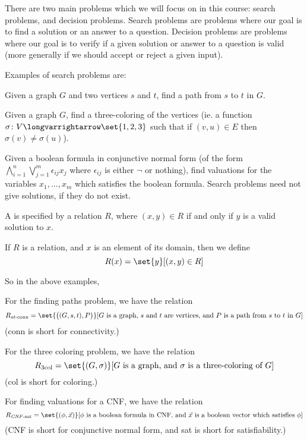 \documentclass[10pt]{article}
\let\longto=\longvarrightarrow
\begin{document}


\bigskip

There are two main problems which we will focus on in this course: search problems, and decision problems.
Search problems are problems where our goal is to find a solution or an answer to a question.
Decision problems are problems where our goal is to verify if a given solution or answer to a question is valid (more generally if we should accept or reject a given input).

Examples of search problems are:
\benum
    \item Given a graph $G$ and two vertices $s$ and $t$, find a path from $s$ to $t$ in $G$.
    \item Given a graph $G$, find a three-coloring of the vertices (ie. a function $\sigma\colon V\longto\set{1,2,3}$ such that if $(v,u)\in E$ then $\sigma(v)\neq\sigma(u)$).
    \item Given a boolean formula in conjunctive normal form (of the form $\bigwedge_{i=1}^n\bigvee_{j=1}^m\epsilon_{ij}x_j$ where $\epsilon_{ij}$ is either $\neg$ or nothing), find valuations for the
    variables $x_1,\dots,x_m$ which satisfies the boolean formula.
\eenum
Search problems need not give solutions, if they do not exist.

\begin{defn*}

    A  is specified by a relation $R$, where $(x,y)\in R$ if and only if $y$ is a valid solution to $x$.

\end{defn*}

\begin{defn*}

    If $R$ is a relation, and $x$ is an element of its domain, then we define
    \[ R(x) = \set{y}[(x,y)\in R] \]

\end{defn*}

So in the above examples,
\benum
    \item For the finding paths problem, we have the relation
    \[ R_{st\text{-conn}} = \set{\bigl((G,s,t),P\bigr)}[\text{$G$ is a graph, $s$ and $t$ are vertices, and $P$ is a path from $s$ to $t$ in $G$}] \]
    (conn is short for connectivity.)
    \item For the three coloring problem, we have the relation
    \[ R_{3\text{col}} = \set{(G,\sigma)}[\text{$G$ is a graph, and $\sigma$ is a three-coloring of $G$}] \]
    (col is short for coloring.)
    \item For finding valuations for a CNF, we have the relation
    \[ R_{\mathit{CNF}\text{-sat}} = \set{(\phi,\vec x)}[\text{$\phi$ is a boolean formula in CNF, and $\vec x$ is a boolean vector which satisfies $\phi$}] \] 
    (CNF is short for conjunctive normal form, and sat is short for satisfiability.)
\eenum
\end{document}
